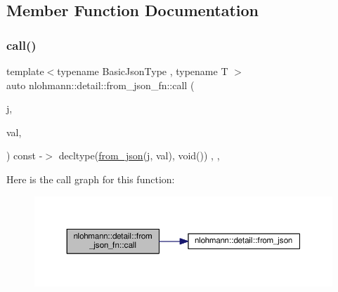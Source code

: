 \subsection{Member Function Documentation}
\mbox{\label{structnlohmann_1_1detail_1_1from__json__fn_a2d6108c9d0f54e97134203984ed8d3a3}} 
\subsubsection{\texorpdfstring{call()}{call()}\hspace{0.1cm}{\footnotesize\ttfamily [1/2]}}
{\footnotesize\ttfamily template$<$typename Basic\+Json\+Type , typename T $>$ \\
auto nlohmann\+::detail\+::from\+\_\+json\+\_\+fn\+::call (\begin{DoxyParamCaption}\item[{const Basic\+Json\+Type \&}]{j,  }\item[{T \&}]{val,  }\item[{\hyperlink{structnlohmann_1_1detail_1_1priority__tag}{priority\+\_\+tag}$<$ 1 $>$}]{ }\end{DoxyParamCaption}) const -\/$>$ decltype(\hyperlink{namespacenlohmann_1_1detail_a58117f225f43d03e3a0a4a6f3d77c9d9}{from\+\_\+json}(j, val), void())
    \hspace{0.3cm}{\ttfamily [inline]}, {\ttfamily [private]}, {\ttfamily [noexcept]}}

Here is the call graph for this function\+:\nopagebreak
\begin{figure}[H]
\begin{center}
\leavevmode
\includegraphics[width=350pt]{structnlohmann_1_1detail_1_1from__json__fn_a2d6108c9d0f54e97134203984ed8d3a3_cgraph}
\end{center}
\end{figure}
\mbox{\label{structnlohmann_1_1detail_1_1from__json__fn_a4949ab091885f0958ccff41dc5fa6725}} 
